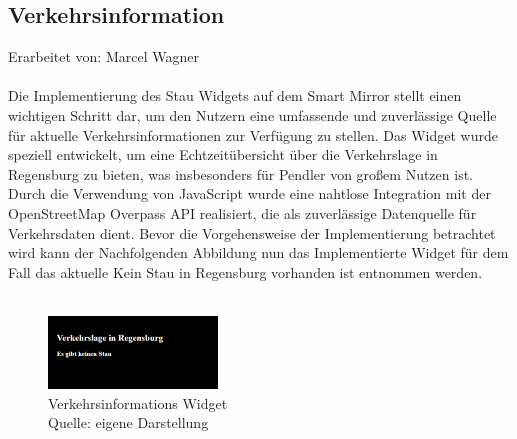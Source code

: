 \subsection{Verkehrsinformation}
Erarbeitet von: Marcel Wagner \\ \\
\noindent
Die Implementierung des Stau Widgets auf dem Smart Mirror stellt einen wichtigen Schritt dar, um den Nutzern eine umfassende und zuverlässige Quelle für aktuelle Verkehrsinformationen zur Verfügung zu stellen. Das Widget wurde speziell entwickelt, um eine Echtzeitübersicht über die Verkehrslage in Regensburg zu bieten, was insbesonders für Pendler von großem Nutzen ist. Durch die Verwendung von JavaScript wurde eine nahtlose Integration mit der OpenStreetMap Overpass API realisiert, die als zuverlässige Datenquelle für Verkehrsdaten dient. Bevor die Vorgehensweise der Implementierung betrachtet wird kann der Nachfolgenden Abbildung nun das Implementierte Widget  für dem Fall das aktuelle Kein Stau in Regensburg vorhanden ist entnommen werden. \\ \\
\noindent
\begin{figure}[h]
    \centering
    \includegraphics[width=0.4\textwidth]{pictures/traffic_widget.png}
  \captionsetup{justification=centering, labelformat=simple, singlelinecheck=false}
    \caption[Verkehrsinformations Widget]{Verkehrsinformations Widget\\ Quelle: eigene Darstellung}
\end{figure}


